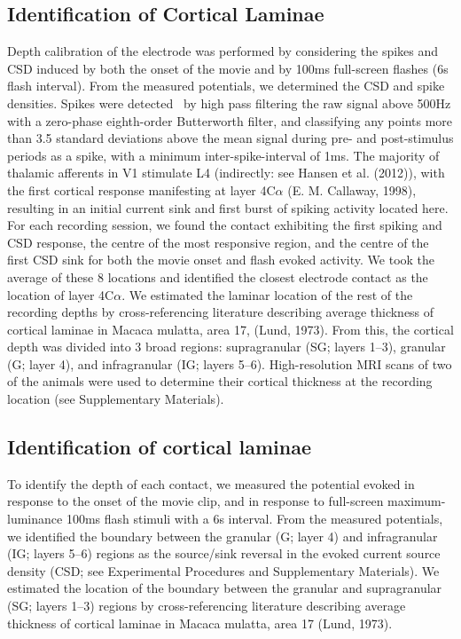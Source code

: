 \subsection{Identification of Cortical Laminae}
Depth calibration of the electrode was performed by considering the spikes and \ac{CSD} induced by both the onset of the movie and by 100ms full-screen flashes (6s flash interval). From the measured potentials, we determined the \ac{CSD} and spike densities. Spikes were detected \ by high pass filtering the raw signal above 500Hz with a zero-phase eighth-order Butterworth filter, and classifying any points more than 3.5 standard deviations above the mean signal during pre- and post-stimulus periods as a spike, with a minimum inter-spike-interval of 1ms. The majority of thalamic afferents in \ac{V1} stimulate \ac{L4} (indirectly: see Hansen et al. (2012)), with the first cortical response manifesting at layer 4C$\alpha$ (E. M. Callaway, 1998), resulting in an initial current sink and first burst of spiking activity located here. For each recording session, we found the contact exhibiting the first spiking and \ac{CSD} response, the centre of the most responsive region, and the centre of the first \ac{CSD} sink for both the movie onset and flash evoked activity. We took the average of these 8 locations and identified the closest electrode contact as the location of layer 4C$\alpha$. We estimated the laminar location of the rest of the recording depths by cross-referencing literature describing average thickness of cortical laminae in Macaca mulatta, area 17, (Lund, 1973). From this, the cortical depth was divided into 3 broad regions: supragranular (SG; layers 1--3), granular (G; layer 4), and infragranular (IG; layers 5--6). High-resolution \ac{MRI} scans of two of the animals were used to determine their cortical thickness at the recording location (see Supplementary Materials).

\subsection{Identification of cortical laminae}
To identify the depth of each contact, we measured the potential evoked in response to the onset of the movie clip, and in response to full-screen maximum-luminance 100ms flash stimuli with a 6s interval. From the measured potentials, we identified the boundary between the granular (G; layer 4) and infragranular (IG; layers 5--6) regions as the source/sink reversal in the evoked current source density (\ac{CSD}; see Experimental Procedures and Supplementary Materials). We estimated the location of the boundary between the granular and supragranular (SG; layers 1--3) regions by cross-referencing literature describing average thickness of cortical laminae in Macaca mulatta, area 17 (Lund, 1973).

